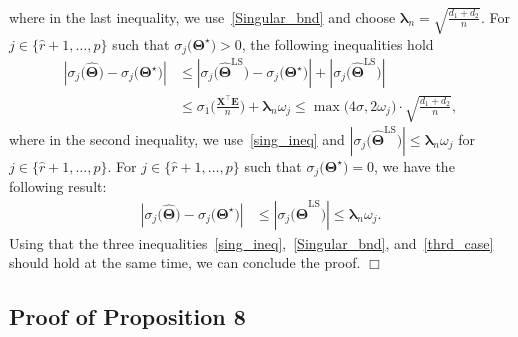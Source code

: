 \documentclass[alpha-refs]{wiley-article}
\begin{document}
where in the last inequality, we use~\eqref{Singular_bnd} and choose $\boldsymbol{\lambda}_{n}=\sqrt{\frac{d_{1}+d_{2}}{n}}$. For $j\in\{\widehat{r}+1,\dots,p\}$ such that $\sigma_{j}\big( \boldsymbol{\Theta}^{\star} \big) > 0$, the following inequalities hold
\begin{align}
    \left| \sigma_{j}\big(\widehat{\boldsymbol{\Theta}}\big)-\sigma_{j}\big(\boldsymbol{\Theta}^{\star}\big)\right|
    &\leq \left|\sigma_{j}\big(\widehat{\boldsymbol{\Theta}}^{\text{LS}}\big)
    -\sigma_{j}\big(\boldsymbol{\Theta}^{\star}\big)\right| + \left| \sigma_{j}\big(\widehat{\boldsymbol{\Theta}}^{\text{LS}}\big) \right| \nonumber \\
    &\leq \sigma_{1}\bigg( \frac{\boldsymbol{X}^{\top}\boldsymbol{E}}{n} \bigg) + \boldsymbol{\lambda}_{n}\omega_{j}
    \leq \max\big(4\sigma,2\omega_{j}\big)\cdot \sqrt{\frac{d_{1}+d_{2}}{n}},  \nonumber
\end{align}
where in the second inequality, we use~\eqref{sing_ineq} and $| \sigma_{j}\big(\widehat{\boldsymbol{\Theta}}^{\text{LS}}\big) |\leq \boldsymbol{\lambda}_{n}\omega_{j}$ for $j\in\{\widehat{r}+1,\dots,p\}$.
For $j \in \{\widehat{r}+1,\dots,p\}$ such that $\sigma_{j}\big( \boldsymbol{\Theta}^{\star} \big) = 0$, we have the following result:
\begin{align}\label{thrd_case}
    \left| \sigma_{j}\big(\widehat{\boldsymbol{\Theta}}\big)-\sigma_{j}\big(\boldsymbol{\Theta}^{\star}\big)\right|
    &\leq \left| \sigma_{j}\big(\widehat{\boldsymbol{\Theta}}^{\text{LS}}\big) \right| \leq \boldsymbol{\lambda}_{n}\omega_{j}.
\end{align}
Using that the three inequalities~\eqref{sing_ineq},~\eqref{Singular_bnd}, and~\eqref{thrd_case} should hold at the same time, we can conclude the proof.
\qquad $\Box$

\subsection{Proof of Proposition 8}
\end{document}
